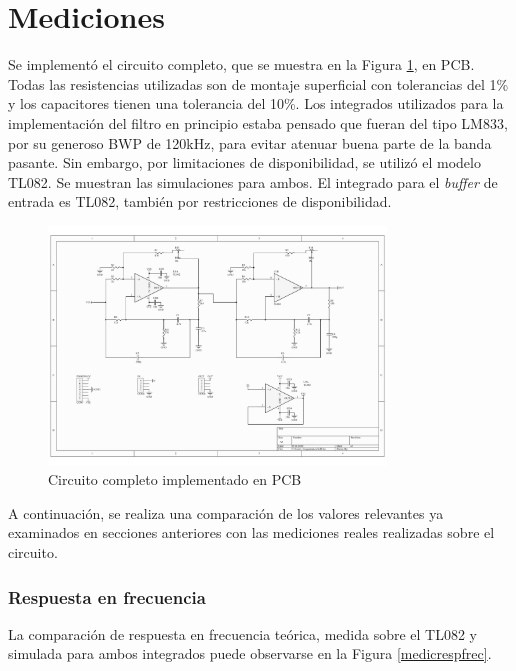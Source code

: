 \section{Mediciones}
Se implementó el circuito completo, que se muestra en la Figura \ref{circuitocompleto}, en PCB. Todas las resistencias utilizadas son de montaje superficial con tolerancias del 1\% y  los capacitores tienen una tolerancia del 10\%. Los integrados utilizados para la implementación del filtro en principio estaba pensado que fueran del tipo LM833, por su generoso BWP de 120kHz, para evitar atenuar buena parte de la banda pasante. Sin embargo, por limitaciones de disponibilidad, se utilizó el modelo TL082. Se muestran las simulaciones para ambos. El integrado para el \emph{buffer} de entrada es TL082, también por restricciones de disponibilidad.

\begin{figure}[H]
    \centering
    \includegraphics[angle=90,origin=c,width=0.8\textwidth]{../Ex3/Resources/Esquematico.pdf}
    \caption{Circuito completo implementado en PCB}
    \label{circuitocompleto}
\end{figure}

A continuación, se realiza una comparación de los valores relevantes ya examinados en secciones anteriores con las mediciones reales realizadas sobre el circuito.

\subsubsection{Respuesta en frecuencia}
La comparación de respuesta en frecuencia teórica, medida sobre el TL082 y simulada para ambos integrados puede observarse en la Figura \ref{medicrespfrec}.

